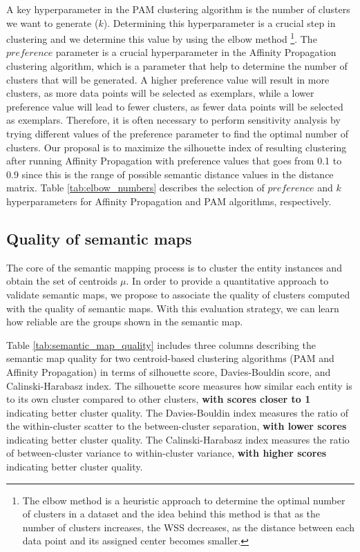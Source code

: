 \documentclass{ieeeaccess}
\begin{document}
A key hyperparameter in the PAM clustering algorithm
is the number of clusters we want to generate ($k$).
Determining
this hyperparameter is a crucial step in clustering and
we determine this value by using the elbow method \cite{Thorndike1953} \footnote{The
elbow method is a heuristic approach to determine the
optimal number of clusters in a dataset and the idea
behind this method is that as the number of clusters
increases, the WSS decreases, as the distance between 
each data point and its assigned center becomes
smaller.}. The $preference$ parameter is a crucial
hyperparameter in the Affinity Propagation 
clustering algorithm, which is a parameter that
help to determine the number of clusters that will
be generated. A higher preference value will result
in more clusters, as more data points will be selected
as exemplars, while a lower preference value will
lead to fewer clusters, as fewer data points will be 
selected as exemplars. Therefore, it is often necessary
to perform sensitivity analysis by trying different
values of the preference parameter to find the optimal
number of clusters. Our proposal is to maximize the
silhouette index of resulting clustering after running
Affinity Propagation with preference values that goes
from 0.1 to 0.9 since this is the range of possible
semantic distance values in the distance matrix. 
Table \ref{tab:elbow_numbers} describes
the selection of $preference$ and $k$ hyperparameters
for Affinity Propagation and PAM algorithms, respectively.

\subsection{Quality of semantic maps}

The core of the semantic mapping process is to 
cluster the entity instances and obtain the set 
of centroids $\mu$. In order to provide a quantitative 
approach to validate semantic maps, we propose to
associate the quality of clusters computed with
the quality of semantic maps. With this evaluation
strategy, we can learn how reliable are the groups
shown in the semantic map.

Table \ref{tab:semantic_map_quality} includes
three columns describing the semantic map quality
for two centroid-based clustering algorithms (PAM
and Affinity Propagation) in terms of silhouette
score, Davies-Bouldin score, and Calinski-Harabasz 
index. The silhouette score measures how similar
each entity is to its own cluster compared to other
clusters, \textbf{with scores closer to 1} indicating
better cluster quality. The Davies-Bouldin index 
measures the ratio of the within-cluster scatter
to the between-cluster separation, \textbf{with
lower scores} indicating better cluster quality. The
Calinski-Harabasz index measures the ratio of
between-cluster variance to within-cluster variance,
\textbf{with higher scores} indicating better 
cluster quality.
\end{document}
